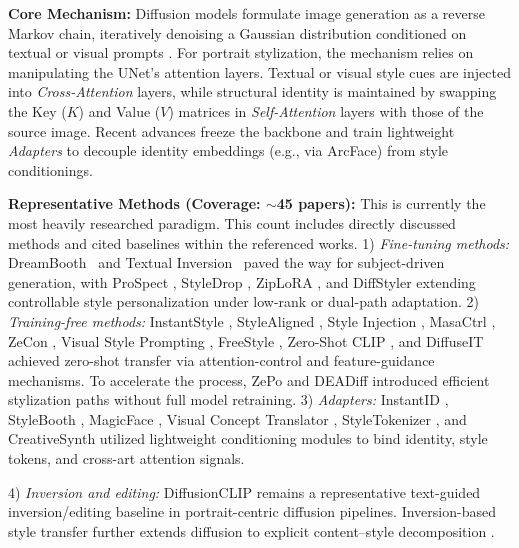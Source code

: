 \documentclass[journal]{IEEEtran}
\begin{document}
\textbf{Core Mechanism:} Diffusion models formulate image generation as a reverse Markov chain, iteratively denoising a Gaussian distribution conditioned on textual or visual prompts \cite{ho2020denoising}. For portrait stylization, the mechanism relies on manipulating the UNet's attention layers. Textual or visual style cues are injected into \textit{Cross-Attention} layers, while structural identity is maintained by swapping the Key ($K$) and Value ($V$) matrices in \textit{Self-Attention} layers with those of the source image. Recent advances freeze the backbone and train lightweight \textit{Adapters} to decouple identity embeddings (e.g., via ArcFace) from style conditionings.

\textbf{Representative Methods (Coverage: $\sim$45 papers):} This is currently the most heavily researched paradigm. This count includes directly discussed methods and cited baselines within the referenced works.
1) \textit{Fine-tuning methods:} DreamBooth~\cite{ruiz2023dreambooth} and Textual Inversion~\cite{gal2022image} paved the way for subject-driven generation, with ProSpect \cite{zhang2023prospectps}, StyleDrop \cite{sohn2023styledrop}, ZipLoRA \cite{shah2023ziplora}, and DiffStyler \cite{huang2024diffstyler} extending controllable style personalization under low-rank or dual-path adaptation.
2) \textit{Training-free methods:} InstantStyle \cite{wang2025instantstyleplus}, StyleAligned \cite{hertz2023styleai}, Style Injection \cite{chung2023styleii}, MasaCtrl \cite{cao2023masactrl}, ZeCon \cite{yang2023zecon}, Visual Style Prompting \cite{jeong2024visualsp}, FreeStyle \cite{he2024freestylefl}, Zero-Shot CLIP \cite{yang2023zeroshotcl}, and DiffuseIT \cite{kwon2022diffuseit} achieved zero-shot transfer via attention-control and feature-guidance mechanisms. To accelerate the process, ZePo \cite{liu2024zepozp} and DEADiff \cite{qi2024deadiff} introduced efficient stylization paths without full model retraining.
3) \textit{Adapters:} InstantID \cite{wang2024instantid}, StyleBooth \cite{han2024styleboothis}, MagicFace \cite{wang2024magicfacetu}, Visual Concept Translator \cite{cheng2023visual}, StyleTokenizer \cite{li2024styletokenizerdi}, and CreativeSynth \cite{huang2024creativesynthcf} utilized lightweight conditioning modules to bind identity, style tokens, and cross-art attention signals.

4) \textit{Inversion and editing:} DiffusionCLIP \cite{kim2022diffusionclip} remains a representative text-guided inversion/editing baseline in portrait-centric diffusion pipelines. Inversion-based style transfer further extends diffusion to explicit content--style decomposition \cite{zhang2022inversionbasedst}.
\end{document}
